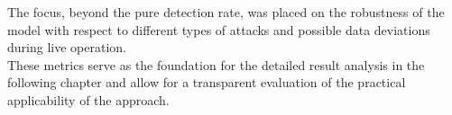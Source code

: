 The focus, beyond the pure detection rate, was placed on the robustness of the model with respect to different types of attacks and possible data deviations during live operation.\\

These metrics serve as the foundation for the detailed result analysis in the following chapter and allow for a transparent evaluation of the practical applicability of the approach.
